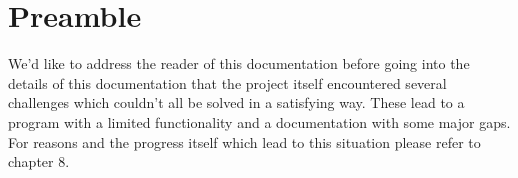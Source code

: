 \section{Preamble}
\label{sec:preamp}

We'd like to address the reader of this documentation before going into the details of this documentation that the project itself encountered several challenges which couldn't all be solved in a satisfying way. These lead to a program with a limited functionality and a documentation with some major gaps. For reasons and the progress itself which lead to this situation please refer to chapter 8.